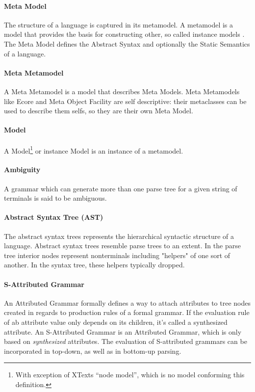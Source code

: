 \paragraph{Meta Model} The structure of a language is captured in its metamodel. A metamodel is a model that provides the basis for constructing other, so called instance models \cite{EMP}. The Meta Model defines the Abstract Syntax and optionally the Static Semantics of a language. \cite{MDSD}

\paragraph{Meta Metamodel} A Meta Metamodel is a model that describes Meta Models. Meta Metamodels like Ecore and Meta Object Facility are self descriptive: their metaclasses can be used to describe them selfs, so they are their own Meta Model. \cite{EMF2nd}

\paragraph{Model} A Model\footnote{\raggedright With exception of XTexts ``node model'', which is no model conforming this definition. }  or instance Model is an instance of a metamodel.

\paragraph{Ambiguity} 
A grammar which can generate more than one parse tree for a given string of terminals is said to be ambiguous.\cite{DragonBook}

\paragraph{Abstract Syntax Tree (AST)}  
The abstract syntax trees  represents the hierarchical syntactic structure of a language.  Abstract syntax trees resemble parse trees to an extent. In the parse tree interior nodes represent nonterminals including "helpers" of one sort of another. In the syntax tree, these helpers typically dropped. \cite{DragonBook}

\paragraph{S-Attributed Grammar} 
An Attributed Grammar formally defines a way to attach attributes to tree nodes created in regards to production rules of a formal grammar. If the evaluation rule of ab attribute value only depends on its children, it's called a synthesized attribute. An S-Attributed Grammar is an Attributed Grammar, which is only based on \emph{synthesized} attributes. The evaluation of S-attributed grammars can be incorporated in top-down, as well as in bottom-up parsing. \cite{ParserBook}
 
